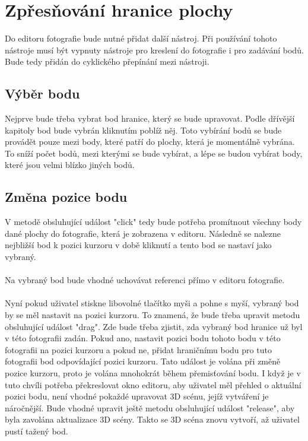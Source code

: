 \documentclass[11pt,twoside,a4paper]{book}
\begin{document}
\section{Zpřesňování hranice plochy}
Do editoru fotografie bude nutné přidat další nástroj. Při používání tohoto nástroje musí být vypnuty nástroje pro kreslení do fotografie i pro zadávání bodů. Bude tedy přidán do cyklického přepínání mezi nástroji.

\subsection{Výběr bodu}
Nejprve bude třeba vybrat bod hranice, který se bude upravovat. Podle dřívější kapitoly bod bude vybrán kliknutím poblíž něj. Toto vybírání bodů se bude provádět pouze mezi body, které patří do plochy, která je momentálně vybrána. To sníží počet bodů, mezi kterými se bude vybírat, a lépe se budou vybírat body, které jsou velmi blízko jiných bodů.
\subsection{Změna pozice bodu}
V metodě obsluhující událost "click" tedy bude potřeba promítnout všechny body dané plochy do fotografie, která je zobrazena v editoru. Následně se nalezne nejbližší bod k pozici kurzoru v době kliknutí a tento bod se nastaví jako vybraný.  
\paragraph{}
Na vybraný bod bude vhodné uchovávat referenci přímo v editoru fotografie.
\paragraph{}
Nyní pokud uživatel stiskne libovolné tlačítko myši a pohne s myší, vybraný bod by se měl nastavit na pozici kurzoru. To znamená, že bude třeba upravit metodu obsluhující událost "drag". Zde bude třeba zjistit, zda vybraný bod hranice už byl v této fotografii zadán. Pokud ano, nastavit pozici bodu tohoto bodu v této fotografii na pozici kurzoru a pokud ne, přidat hraničnímu bodu pro tuto fotografii bod odpovídající pozici kurzoru. Tato událost je volána při změně pozice kurzoru, proto je volána mnohokrát během přemisťování bodu.  I když je v tuto chvíli potřeba překreslovat okno editoru, aby uživatel měl přehled o aktuální pozici bodu, není vhodné pokaždé upravovat 3D scénu, jejíž vytváření je náročnější. Bude vhodné upravit ještě metodu obsluhující událost "release", aby byla zavolána aktualizace 3D scény. Takto se 3D scéna znovu vytvoří, až uživatel pustí tažený bod.
\end{document}
